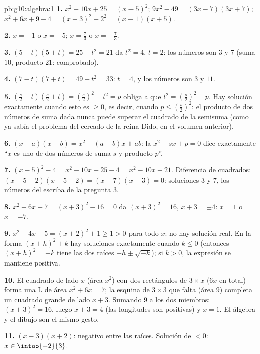 \begin{solution}{pb:g10:algebra:1}
\textbf{1.} $x^2 - 10x + 25 = (x - 5)^2$;
$9x^2 - 49 = (3x - 7)(3x + 7)$;
$x^2 + 6x + 9 - 4 = (x + 3)^2 - 2^2 = (x + 1)(x + 5)$.

\textbf{2.} $x = -1$ o $x = -5$; \quad $x = \frac73$ o
$x = -\frac73$.

\textbf{3.} $(5 - t)(5 + t) = 25 - t^2 = 21$ da $t^2 = 4$, $t = 2$: los
números son $3$ y $7$ (suma $10$, producto $21$: comprobado).

\textbf{4.} $(7 - t)(7 + t) = 49 - t^2 = 33$: $t = 4$, y los números son
$3$ y $11$.

\textbf{5.} $\left(\frac s2 - t\right)\left(\frac s2 + t\right)
= \left(\frac s2\right)^2 - t^2 = p$ obliga a que
$t^2 = \left(\frac s2\right)^2 - p$. Hay solución exactamente cuando esto
es $\geq 0$, es decir, cuando $p \leq \left(\frac s2\right)^2$: el
producto de dos números de suma dada nunca puede superar el cuadrado de la
semisuma (como ya sabía el problema del cercado de la reina Dido, en el
volumen anterior).

\textbf{6.} $(x - a)(x - b) = x^2 - (a + b)x + ab$: la 
$x^2 - sx + p = 0$ dice exactamente ``$x$ es uno de dos números de suma
$s$ y producto $p$''.

\textbf{7.} $(x-5)^2 - 4 = x^2 - 10x + 25 - 4 = x^2 - 10x + 21$.
Diferencia de cuadrados: $(x - 5 - 2)(x - 5 + 2) = (x - 7)(x - 3) = 0$:
soluciones $3$ y $7$, los números del escriba de la pregunta 3.

\textbf{8.} $x^2 + 6x - 7 = (x + 3)^2 - 16 = 0$ da $(x + 3)^2 = 16$,
$x + 3 = \pm 4$: $x = 1$ o $x = -7$.

\textbf{9.} $x^2 + 4x + 5 = (x + 2)^2 + 1 \geq 1 > 0$ para todo $x$: no
hay solución real. En la forma $(x + h)^2 + k$ hay soluciones exactamente
cuando $k \leq 0$ (entonces $(x+h)^2 = -k$ tiene las dos raíces
$-h \pm \sqrt{-k}$); si $k > 0$, la expresión se mantiene positiva.

\textbf{10.} El cuadrado de lado $x$ (área $x^2$) con dos rectángulos de
$3 \times x$ ($6x$ en total) forma una L de área $x^2 + 6x = 7$; la
esquina de $3 \times 3$ que falta (área $9$) completa un cuadrado grande
de lado $x + 3$. Sumando $9$ a los dos miembros: $(x + 3)^2 = 16$, luego
$x + 3 = 4$ (las longitudes son positivas) y $x = 1$. El álgebra y el
dibujo son el mismo gesto.

\textbf{11.} $(x-3)(x+2)$: negativo entre las raíces. Solución de $< 0$:
$x \in \intoo{-2}{3}$.


\end{solution}
